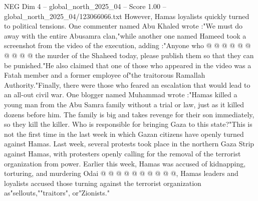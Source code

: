 \begin{textsample}{NEG Dim 4 – global\_north\_2025\_04 – Score 1.00 – global\_north\_2025\_04/123066066.txt}
However, Hamas loyalists quickly turned to political tensions.
One commenter named Abu Khaled wrote :"We must do away with the entire Abusamra clan,"while another one named Hameed took a screenshot from the video of the execution, adding :"Anyone who @ @ @ @ @ @ @ @ @ @ the murder of the Shaheed today, please publish them so that they can be punished."He also claimed that one of those who appeared in the video was a Fatah member and a former employee of"the traitorous Ramallah Authority."Finally, there were those who feared an escalation that would lead to an all-out civil war.
One blogger named Muhammad wrote :"Hamas killed a young man from the Abu Samra family without a trial or law, just as it killed dozens before him.
The family is big and takes revenge for their son immediately, so they kill the killer.
Who is responsible for bringing Gaza to this state?"This is not the first time in the last week in which Gazan citizens have openly turned against Hamas.
Last week, several protests took place in the northern Gaza Strip against Hamas, with protesters openly calling for the removal of the terrorist organization from power.
Earlier this week, Hamas was accused of kidnapping, torturing, and murdering Odai @ @ @ @ @ @ @ @ @ @, Hamas leaders and loyalists accused those turning against the terrorist organization as"sellouts,""traitors", or"Zionists."

\end{textsample}
